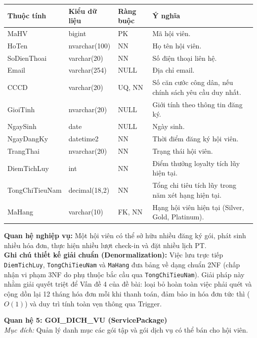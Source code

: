 \documentclass[11pt, a4paper]{article}
\begin{document}
\begin{small}
\begin{tabularx}{\textwidth}{| C{3cm} | C{2.4cm} | C{2.2cm} | Y |}
\hline
\textbf{Thuộc tính} & \textbf{Kiểu dữ liệu} & \textbf{Ràng buộc} & \textbf{Ý nghĩa} \\
\hline
MaHV & bigint & PK & Mã hội viên. \\
\hline
HoTen & nvarchar(100) & NN & Họ tên hội viên. \\
\hline
SoDienThoai & varchar(20) & NN & Số điện thoại liên hệ. \\
\hline
Email & varchar(254) & NULL & Địa chỉ email. \\
\hline
CCCD & varchar(20) & UQ, NN & Số căn cước công dân, nếu chính sách yêu cầu duy nhất. \\
\hline
GioiTinh & nvarchar(20) & NULL & Giới tính theo thông tin đăng ký. \\
\hline
NgaySinh & date & NULL & Ngày sinh. \\
\hline
NgayDangKy & datetime2 & NN & Thời điểm đăng ký hội viên. \\
\hline
TrangThai & nvarchar(20) & NN & Trạng thái hội viên. \\
\hline
DiemTichLuy & int & NN & Điểm thưởng loyalty tích lũy hiện tại. \\
\hline
TongChiTieuNam & decimal(18,2) & NN & Tổng chi tiêu tích lũy trong năm xét hạng hiện tại. \\
\hline
MaHang & varchar(10) & FK, NN & Hạng hội viên hiện tại (Silver, Gold, Platinum). \\
\hline
\end{tabularx}
\end{small}

\textbf{Quan hệ nghiệp vụ:} Một hội viên có thể sở hữu nhiều đăng ký gói, phát sinh nhiều hóa đơn, thực hiện nhiều lượt check-in và đặt nhiều lịch PT. \\
\textbf{Ghi chú thiết kế giải chuẩn (Denormalization):} Việc lưu trực tiếp \texttt{DiemTichLuy}, \texttt{TongChiTieuNam} và \texttt{MaHang} đưa bảng về dạng chuẩn 2NF (chấp nhận vi phạm 3NF do phụ thuộc bắc cầu qua \texttt{TongChiTieuNam}). Giải pháp này nhằm giải quyết triệt để Vấn đề 4 của đề bài: loại bỏ hoàn toàn việc phải quét và cộng dồn lại 12 tháng hóa đơn mỗi khi thanh toán, đảm bảo in hóa đơn tức thì ($O(1)$) và duy trì tính toàn vẹn thông qua Trigger.

\vspace{0.8em}
\textbf{Quan hệ 5: GOI\_DICH\_VU (ServicePackage)} \\
\textit{Mục đích:} Quản lý danh mục các gói tập và gói dịch vụ có thể bán cho hội viên.
\end{document}
